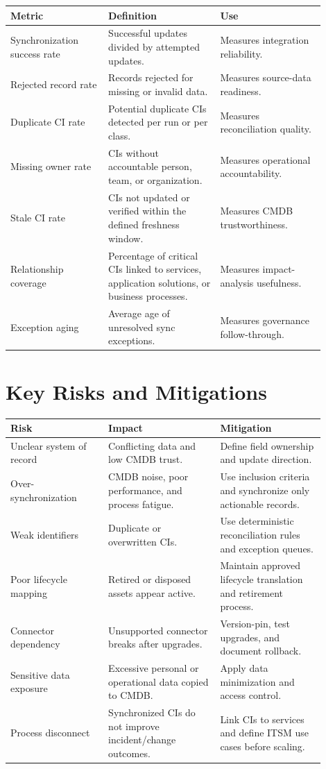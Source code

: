 \documentclass[11pt]{article}
\begin{document}
\begin{longtable}{p{0.28\linewidth}p{0.32\linewidth}p{0.30\linewidth}}
\toprule
\rowcolor{LightBlue}\textbf{Metric} & \textbf{Definition} & \textbf{Use} \\
\midrule
Synchronization success rate & Successful updates divided by attempted updates. & Measures integration reliability. \\
Rejected record rate & Records rejected for missing or invalid data. & Measures source-data readiness. \\
Duplicate CI rate & Potential duplicate CIs detected per run or per class. & Measures reconciliation quality. \\
Missing owner rate & CIs without accountable person, team, or organization. & Measures operational accountability. \\
Stale CI rate & CIs not updated or verified within the defined freshness window. & Measures CMDB trustworthiness. \\
Relationship coverage & Percentage of critical CIs linked to services, application solutions, or business processes. & Measures impact-analysis usefulness. \\
Exception aging & Average age of unresolved sync exceptions. & Measures governance follow-through. \\
\bottomrule
\end{longtable}

\section{Key Risks and Mitigations}

\begin{longtable}{p{0.28\linewidth}p{0.32\linewidth}p{0.30\linewidth}}
\toprule
\rowcolor{LightBlue}\textbf{Risk} & \textbf{Impact} & \textbf{Mitigation} \\
\midrule
Unclear system of record & Conflicting data and low CMDB trust. & Define field ownership and update direction. \\
Over-synchronization & CMDB noise, poor performance, and process fatigue. & Use inclusion criteria and synchronize only actionable records. \\
Weak identifiers & Duplicate or overwritten CIs. & Use deterministic reconciliation rules and exception queues. \\
Poor lifecycle mapping & Retired or disposed assets appear active. & Maintain approved lifecycle translation and retirement process. \\
Connector dependency & Unsupported connector breaks after upgrades. & Version-pin, test upgrades, and document rollback. \\
Sensitive data exposure & Excessive personal or operational data copied to CMDB. & Apply data minimization and access control. \\
Process disconnect & Synchronized CIs do not improve incident/change outcomes. & Link CIs to services and define ITSM use cases before scaling. \\
\bottomrule
\end{longtable}
\end{document}
